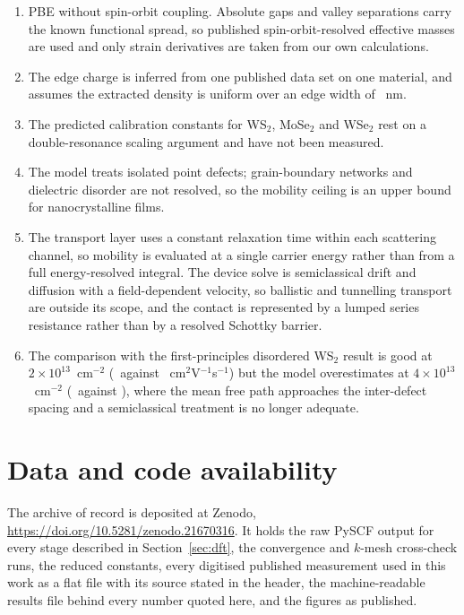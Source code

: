 \documentclass[aip,apl,amsmath,amssymb,reprint,longbibliography]{revtex4-1}
\begin{document}
\begin{enumerate}
\item PBE without spin-orbit coupling. Absolute gaps and valley separations
carry the known functional spread, so published spin-orbit-resolved effective
masses are used\cite{Jin2014,Kormanyos2015} and only strain derivatives are
taken from our own calculations.
\item The edge charge is inferred from one published data set on one material,
and assumes the extracted density is uniform over an edge width of
\Wedge~nm.
\item The predicted calibration constants for WS$_2$, MoSe$_2$ and WSe$_2$
rest on a double-resonance scaling argument and have not been measured.
\item The model treats isolated point defects; grain-boundary networks and
dielectric disorder are not resolved, so the mobility ceiling is an upper
bound for nanocrystalline films.
\item The transport layer uses a constant relaxation time within each
scattering channel, so mobility is evaluated at a single carrier energy rather
than from a full energy-resolved integral. The device solve is semiclassical
drift and diffusion with a field-dependent velocity, so ballistic and
tunnelling transport are outside its scope, and the contact is represented by a
lumped series resistance rather than by a resolved Schottky barrier.
\item The comparison with the first-principles disordered WS$_2$
result\cite{Dossena2025} is good at $2\times10^{13}$~cm$^{-2}$
(\DosOnePred\ against \DosOneRef~cm$^2$V$^{-1}$s$^{-1}$) but the model
overestimates at $4\times10^{13}$~cm$^{-2}$ (\DosTwoPred\ against
\DosTwoRef), where the mean free path approaches the inter-defect spacing and
a semiclassical treatment is no longer adequate.
\end{enumerate}

\section{Data and code availability}

The archive of record is deposited at Zenodo,
\url{https://doi.org/10.5281/zenodo.21670316}.\cite{Mahim2026data} It holds the
raw PySCF output for every stage described in Section~\ref{sec:dft}, the
convergence and $k$-mesh cross-check runs, the reduced constants, every
digitised published measurement used in this work as a flat file with its
source stated in the header, the machine-readable results file behind every
number quoted here, and the figures as published.
\end{document}
